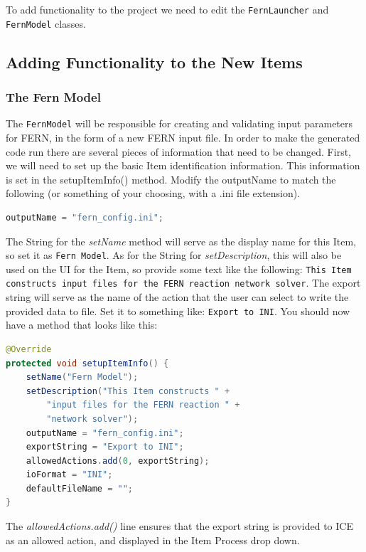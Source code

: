 To add functionality to the project we need to edit
the \texttt{FernLauncher} and \texttt{FernModel} classes.

\subsection{Adding Functionality to the New Items}

\subsubsection{The Fern Model}

The \texttt{FernModel} will be responsible for creating and
validating input parameters for FERN, in the form of a new FERN input file.  In
order to make the generated code run there are several pieces of information that need to be changed.  First, we
will need to set up the basic Item identification information. This information
is set in the setupItemInfo() method. Modify the outputName to match the
following (or something of your choosing, with a .ini file extension).

\begin{lstlisting}[language=Java]
outputName = "fern_config.ini";
\end{lstlisting}

The String for the \emph{setName} method will serve as the display name
for this Item, so set it as \texttt{Fern Model}.
As for the String for \emph{setDescription}, this will also be used on the UI
for the Item, so provide some text like the following: \texttt{This Item constructs input files
for the FERN reaction network solver}. The export string will serve as the name
of the action that the user can select to write the provided data to file. Set
it to something like: \texttt{Export to INI}. You should now have a method that
looks like this:

\begin{lstlisting}[language=Java]
@Override
protected void setupItemInfo() {
	setName("Fern Model");
	setDescription("This Item constructs " +
	    "input files for the FERN reaction " +
	    "network solver"); 
	outputName = "fern_config.ini";   
	exportString = "Export to INI";
	allowedActions.add(0, exportString);
	ioFormat = "INI";
	defaultFileName = "";
}
\end{lstlisting}

The \emph{allowedActions.add()} line ensures that the export string is provided
to ICE as an allowed action, and displayed in the Item Process drop down.

